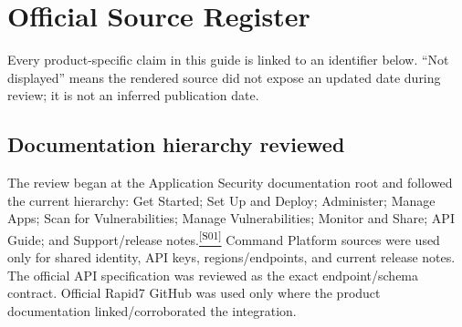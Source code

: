 \documentclass[11pt,letterpaper,oneside]{scrreprt}
\newcommand{\src}[1]{\hyperref[src:#1]{\textsuperscript{\color{R7Orange}[#1]}}}
\newcommand{\chapterlead}[1]{\begin{tcolorbox}[enhanced,colback=R7Light,colframe=R7Light,boxrule=0pt,borderline west={3pt}{0pt}{R7Orange},arc=0pt,left=9pt,right=9pt,top=7pt,bottom=7pt]#1\end{tcolorbox}}
\begin{document}
\chapter{Official Source Register}
\chapterlead{Every product-specific claim in this guide is linked to an identifier below. ``Not displayed'' means the rendered source did not expose an updated date during review; it is not an inferred publication date.}

\section{Documentation hierarchy reviewed}
The review began at the Application Security documentation root and followed the current hierarchy: Get Started; Set Up and Deploy; Administer; Manage Apps; Scan for Vulnerabilities; Manage Vulnerabilities; Monitor and Share; API Guide; and Support/release notes.\src{S01} Command Platform sources were used only for shared identity, API keys, regions/endpoints, and current release notes. The official API specification was reviewed as the exact endpoint/schema contract. Official Rapid7 GitHub was used only where the product documentation linked/corroborated the integration.
\end{document}
